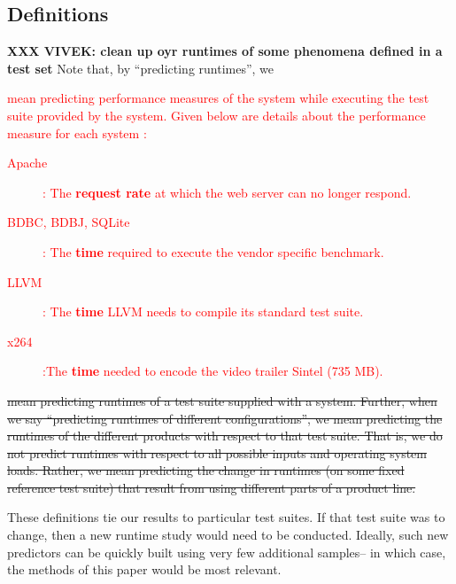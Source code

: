 \documentclass{sig-alternative}
\begin{document}
\subsection{Definitions}

{\bf XXX VIVEK: clean up oyr
runtimes of some phenomena defined in a test
set}
Note that, by   ``predicting runtimes'', we 
\textcolor{red}{mean predicting performance measures of the system while executing the test suite provided by the system. Given below are details about the performance measure for each system \cite{siegmund2012predicting}:
\begin{description}
\item[Apache]: The \textbf{request rate} at which the web server can no longer respond.
\item[BDBC, BDBJ, SQLite]: The \textbf{time} required to execute the vendor specific benchmark. 
\item[LLVM]: The \textbf{time} LLVM needs to compile its standard test suite. 
\item[x264]:The \textbf{time} needed to encode the video trailer Sintel (735 MB). 
\end{description}}
\st{mean predicting
runtimes of a test suite supplied with a system. Further, when we say ``predicting runtimes
of different configurations'', we mean predicting the runtimes of the different products
with respect to that test suite.  That is, we do not  predict runtimes with respect
to all possible inputs and operating system loads. Rather, we  mean predicting
the change in runtimes (on some fixed reference test suite) that result from using different
parts of a product line.}

These definitions tie our results to particular test suites.
If that test suite was to change, then a  new
runtime study would need  to be conducted. Ideally, such new predictors
can be quickly built using very few additional samples-- in which case, the methods
of this paper would be most relevant.
\end{document}
